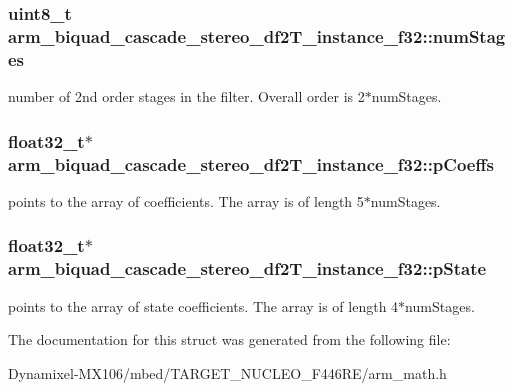 \subsubsection[{\texorpdfstring{num\+Stages}{numStages}}]{\setlength{\rightskip}{0pt plus 5cm}uint8\+\_\+t arm\+\_\+biquad\+\_\+cascade\+\_\+stereo\+\_\+df2\+T\+\_\+instance\+\_\+f32\+::num\+Stages}\hypertarget{structarm__biquad__cascade__stereo__df2_t__instance__f32_a5655328252da5c2c2425ceed253bc4f1}{}\label{structarm__biquad__cascade__stereo__df2_t__instance__f32_a5655328252da5c2c2425ceed253bc4f1}
number of 2nd order stages in the filter. Overall order is 2$\ast$num\+Stages. 
\subsubsection[{\texorpdfstring{p\+Coeffs}{pCoeffs}}]{\setlength{\rightskip}{0pt plus 5cm}float32\+\_\+t$\ast$ arm\+\_\+biquad\+\_\+cascade\+\_\+stereo\+\_\+df2\+T\+\_\+instance\+\_\+f32\+::p\+Coeffs}\hypertarget{structarm__biquad__cascade__stereo__df2_t__instance__f32_a58b15644de62a632c5e9d4a563569dc6}{}\label{structarm__biquad__cascade__stereo__df2_t__instance__f32_a58b15644de62a632c5e9d4a563569dc6}
points to the array of coefficients. The array is of length 5$\ast$num\+Stages. 
\subsubsection[{\texorpdfstring{p\+State}{pState}}]{\setlength{\rightskip}{0pt plus 5cm}float32\+\_\+t$\ast$ arm\+\_\+biquad\+\_\+cascade\+\_\+stereo\+\_\+df2\+T\+\_\+instance\+\_\+f32\+::p\+State}\hypertarget{structarm__biquad__cascade__stereo__df2_t__instance__f32_a2cb00048bb1fe957a03c1ff56dfaf8f0}{}\label{structarm__biquad__cascade__stereo__df2_t__instance__f32_a2cb00048bb1fe957a03c1ff56dfaf8f0}
points to the array of state coefficients. The array is of length 4$\ast$num\+Stages. 

The documentation for this struct was generated from the following file\+:\begin{DoxyCompactItemize}
\item 
Dynamixel-\/\+M\+X106/mbed/\+T\+A\+R\+G\+E\+T\+\_\+\+N\+U\+C\+L\+E\+O\+\_\+\+F446\+R\+E/arm\+\_\+math.\+h\end{DoxyCompactItemize}

